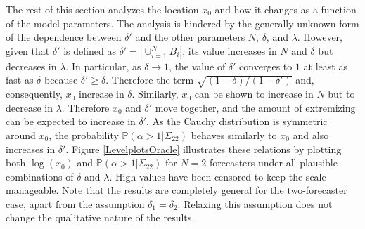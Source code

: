 \documentclass[11pt]{article}
\renewcommand{\P}{\mathbb{P}}
\theoremstyle{definition}
\theoremstyle{definition}
\def\P{{\mathbb P}}
\begin{document}
The rest of this section analyzes the location $x_0$ and how it changes as a function of the model parameters. The analysis is hindered by the generally unknown form of the dependence between $\delta'$ and the other parameters $N$, $\delta$, and $\lambda$. However, given that $\delta'$ is defined as $\delta' = |\cup_{i=1}^N B_i|$, its value  increases in $N$ and $\delta$ but decreases in $\lambda$. In particular, as $\delta \to 1$, the value of $\delta'$ converges to $1$ at least as fast as $\delta$ because  $\delta' \geq \delta$. Therefore the term $\sqrt{(1-\delta)/(1-\delta')}$ and, consequently, $x_0$ increase in $\delta$. Similarly, $x_0$ can be shown to increase in $N$ but to decrease in $\lambda$. Therefore $x_0$ and $\delta'$ move together, and the amount of extremizing
can be expected to increase in $\delta'$.  As the Cauchy distribution is symmetric around $x_0$, the probability $\P(\alpha > 1 | \Sigma_{22})$ behaves similarly to $x_0$ and also increases in $\delta'$.  
Figure \ref{LevelplotsOracle} illustrates these relations by plotting both $\log(x_0)$ and $\P(\alpha > 1 | \Sigma_{22})$ for $N = 2$ forecasters under all plausible combinations of $\delta$ and $\lambda$. High values have been censored to keep the scale manageable. Note that the results are completely general for the two-forecaster case, apart from the assumption $\delta_1 = \delta_2$. Relaxing this assumption does not change the qualitative nature of the results.
\end{document}
